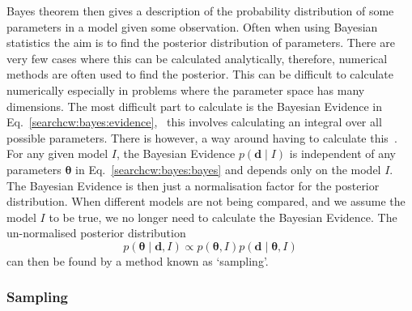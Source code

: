 Bayes theorem then gives a description of the probability distribution of some
parameters in a model given some observation.  Often when using Bayesian
statistics the aim is to find the posterior distribution of parameters.  There are
very few cases where this can be calculated analytically, therefore, numerical
methods are often used to find the posterior.  This
can be difficult to calculate numerically especially in problems where the
parameter space has many dimensions.  The most difficult part to calculate is
the Bayesian Evidence in Eq.~\ref{searchcw:bayes:evidence},~ this involves calculating an
integral over all possible parameters.  There is however, a way around having
to calculate this~.  For any given model $I$, the Bayesian Evidence $p({\bm d}\mid I)$ is
independent of any parameters ${\bm \theta}$ in
Eq.~\ref{searchcw:bayes:bayes} and depends only on the model $I$.
The Bayesian Evidence is then just a normalisation factor for the posterior
distribution.  When different models are not being compared, and we assume the
model $I$ to be true, we no longer need to calculate the Bayesian Evidence.  The
un-normalised posterior distribution
%
\begin{equation}
p({\bm \theta} \mid {\bm d}, I) \propto p({\bm \theta}, I)p({\bm d} \mid {\bm \theta}, I)
\end{equation}
can then be found by a method known as `sampling'.


\subsubsection{Sampling}

